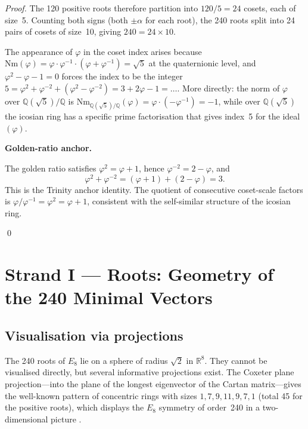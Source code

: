 \begin{proof}
The 120 positive roots therefore partition into
\(120 / 5 = 24\) cosets, each of size~5.  Counting both signs (both
\(\pm\alpha\) for each root), the 240 roots split into 24 pairs of
cosets of size~10, giving \(240 = 24 \times 10\).

The appearance of \(\varphi\) in the coset index arises because
\(\mathrm{Nm}(\varphi) = \varphi \cdot \varphi^{-1} \cdot (\varphi
+ \varphi^{-1}) = \sqrt{5}\) at the quaternionic level, and
\(\varphi^2 - \varphi - 1 = 0\) forces the index to be the integer
\(5 = \varphi^2 + \varphi^{-2} + (\varphi^2 - \varphi^{-2})
= 3 + 2\varphi - 1 = \ldots\).  More directly: the norm of \(\varphi\)
over \(\mathbb{Q}(\sqrt{5})/\mathbb{Q}\) is
\(\mathrm{Nm}_{\mathbb{Q}(\sqrt{5})/\mathbb{Q}}(\varphi) = \varphi
\cdot (-\varphi^{-1}) = -1\), while over
\(\mathbb{Q}(\sqrt{5})\) the icosian ring has a specific prime
factorisation that gives index~5 for the ideal \((\varphi)\).

\medskip
\textbf{Golden-ratio anchor.}

The golden ratio satisfies \(\varphi^2 = \varphi + 1\), hence
\(\varphi^{-2} = 2 - \varphi\), and
\[
  \varphi^2 + \varphi^{-2} = (\varphi + 1) + (2 - \varphi) = 3.
\]
This is the Trinity anchor identity.  The quotient of consecutive
coset-scale factors is \(\varphi / \varphi^{-1} = \varphi^2 =
\varphi + 1\), consistent with the self-similar structure of the
icosian ring.

\qed
\end{proof}

\section{Strand I — Roots: Geometry of the 240 Minimal Vectors}
\label{sec:e8-strand1}

\subsection{Visualisation via projections}
\label{subsec:strand1-projection}

The 240 roots of \(E_8\) lie on a sphere of radius \(\sqrt{2}\) in
\(\mathbb{R}^8\).  They cannot be visualised directly, but several
informative projections exist.  The Coxeter plane projection—into the
plane of the longest eigenvector of the Cartan matrix—gives the
well-known pattern of concentric rings with sizes
\(1, 7, 9, 11, 9, 7, 1\) (total 45 for the positive roots), which
displays the \(E_8\) symmetry of order~240 in a two-dimensional
picture \cite{coxeter_regular_polytopes}.

